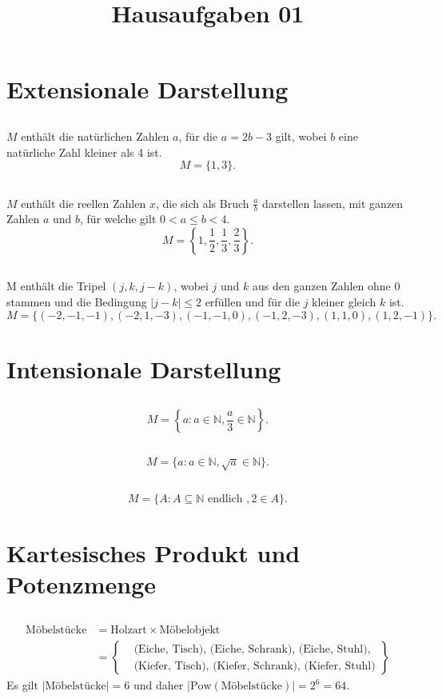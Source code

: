 \documentclass[a4paper]{article}
\title{Hausaufgaben 01}
\newcommand{\pot}{\mathrm {Pow}}
\begin{document}

\section{Extensionale Darstellung}
\subsection{}
$M$ enthält die natürlichen Zahlen $a$, für die $a=2b-3$ gilt, wobei $b$ eine natürliche Zahl kleiner als 4 ist.
$$M = \{ 1,3\}.$$
\subsection{} 
$M$ enthält die reellen Zahlen $x$, die sich als Bruch $\frac{a}{b}$ darstellen lassen, mit ganzen Zahlen $a$ und $b$, für welche gilt $0<a\le b < 4$.
$$M = \left\{ 1, \frac{1}{2}, \frac{1}{3}, \frac{2}{3} \right\}.$$
\subsection{}
M enthält die Tripel $(j,k,j-k)$, wobei $j$ und $k$ aus den ganzen Zahlen ohne 0 stammen und die Bedingung $|j-k|\le 2$ erfüllen und für die $j$ kleiner gleich $k$ ist.
$$M = \{ (-2,-1,-1), (-2,1,-3), (-1,-1, 0), (-1,2,-3),(1,1,0), (1,2,-1)\}.$$

\section{Intensionale Darstellung}
\subsection{} 
$$M = \left\{ a: a\in ℕ, \frac{a}{3} \in ℕ \right\}.$$
\subsection{}
$$M = \{ a: a\in ℕ, \sqrt{a} \in ℕ\}.$$
\subsection{}
$$M = \{ A: A\subseteq ℕ \text{ endlich }, 2 \in A\}.$$

\section{Kartesisches Produkt und Potenzmenge}
\subsection{}
\begin{align*}
    \text{Möbelstücke} &= \text{Holzart} \times \text{Möbelobjekt}\\
    &=\left\{\begin{aligned} & \text{(Eiche, Tisch), (Eiche, Schrank), (Eiche, Stuhl),}\\
    &\text{(Kiefer, Tisch), (Kiefer, Schrank), (Kiefer, Stuhl)}\end{aligned}\right\}
\end{align*}
Es gilt $|\text{Möbelstücke}| = 6$ und daher $|\pot(\text{Möbelstücke}) |=2^6 = 64$.
\end{document}
